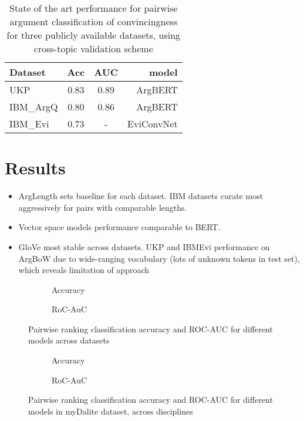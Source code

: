 \documentclass[runningheads]{llncs}
\begin{document}
\begin{table}
\centering\begin{tabular}{l|*{2}{c}r}
	Dataset     & Acc & AUC & model  	   \\
	\hline
	UKP 		& 0.83 & 0.89 & ArgBERT\cite{toledo_automatic_2019}    \\
	IBM\_ArgQ   & 0.80 & 0.86 & ArgBERT\cite{toledo_automatic_2019}    \\
	IBM\_Evi    & 0.73 & - 	  & EviConvNet\cite{gleize_are_2019} \\
\end{tabular}
\caption{State of the art performance for pairwise argument classification of 
convincingness for three publicly available datasets, using cross-topic 
validation scheme}
\label{tab:sota}
\end{table}

\section{Results}

\begin{itemize}
	\item ArgLength sets baseline for each dataset. IBM datasets curate most 
	aggressively for pairs with comparable lengths.
	\item Vector space models performance comparable to BERT.
	\item GloVe most stable across datasets. UKP and IBMEvi performance on 
	ArgBoW due to wide-ranging vocabulary (lots of unknown tokens in test set), 
	which reveals limitation of approach 
\end{itemize}


\begin{figure}
	\begin{subfigure}[t]{0.5\linewidth}
		\centering
		\scalebox{0.5}{}
		\caption{Accuracy}
	\end{subfigure}%
	\qquad
	\begin{subfigure}[t]{0.5\linewidth}
		\centering
		\scalebox{0.5}{}
		\caption{RoC-AuC}
	\end{subfigure}
		\caption{Pairwise ranking classification accuracy and ROC-AUC for 
		different models across datasets}
	\label{fig:performance}
\end{figure}


\begin{figure}
	\begin{subfigure}[t]{0.5\linewidth}
		\centering
		\scalebox{0.5}{}
		\caption{Accuracy}
	\end{subfigure}%
	\qquad
	\begin{subfigure}[t]{0.5\linewidth}
		\centering
		\scalebox{0.5}{}
		\caption{RoC-AuC}
	\end{subfigure}	
		\caption{Pairwise ranking classification accuracy and ROC-AUC for 
		different models in myDalite dataset, across disciplines}
		\label{fig:performance_dalite}
\end{figure}
\end{document}
